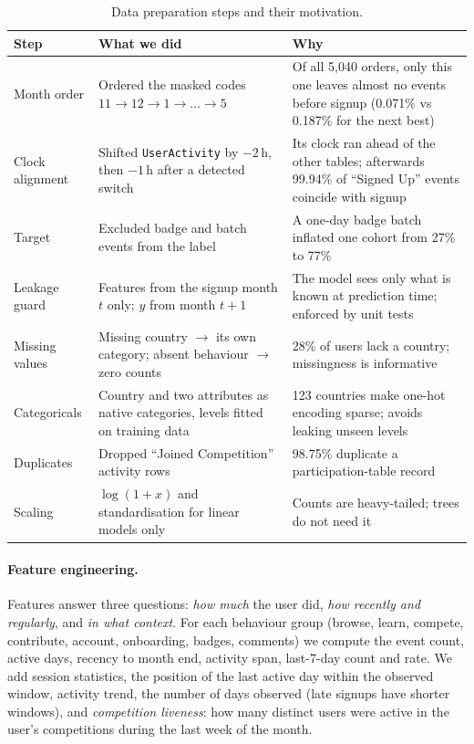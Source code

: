 \documentclass[11pt,a4paper]{article}
\begin{document}
\begin{table}[H]
\centering\small
\begin{tabularx}{\linewidth}{>{\raggedright\arraybackslash}p{2.7cm}XX}
\toprule
Step & What we did & Why\\
\midrule
Month order & Ordered the masked codes $11\to12\to1\to\dots\to5$ & Of all 5{,}040 orders, only this one leaves almost no events before signup (0.071\% vs 0.187\% for the next best)\\
Clock alignment & Shifted \texttt{UserActivity} by $-2$\,h, then $-1$\,h after a detected switch & Its clock ran ahead of the other tables; afterwards 99.94\% of ``Signed Up'' events coincide with signup\\
Target & Excluded badge and batch events from the label & A one-day badge batch inflated one cohort from 27\% to 77\%\\
Leakage guard & Features from the signup month $t$ only; $y$ from month $t{+}1$ & The model sees only what is known at prediction time; enforced by unit tests\\
Missing values & Missing country $\to$ its own category; absent behaviour $\to$ zero counts & 28\% of users lack a country; missingness is informative\\
Categoricals & Country and two attributes as native categories, levels fitted on training data & 123 countries make one-hot encoding sparse; avoids leaking unseen levels\\
Duplicates & Dropped ``Joined Competition'' activity rows & 98.75\% duplicate a participation-table record\\
Scaling & $\log(1+x)$ and standardisation for linear models only & Counts are heavy-tailed; trees do not need it\\
\bottomrule
\end{tabularx}
\caption{Data preparation steps and their motivation.}
\label{tab:prep}
\end{table}

\paragraph{Feature engineering.} Features answer three questions: \emph{how much} the user did,
\emph{how recently and regularly}, and \emph{in what context}. For each behaviour group (browse, learn,
compete, contribute, account, onboarding, badges, comments) we compute the event count, active days, recency
to month end, activity span, last-7-day count and rate. We add session statistics, the position of the last
active day within the observed window, activity trend, the number of days observed (late signups have
shorter windows), and \emph{competition liveness}: how many distinct users were active in the user's
competitions during the last week of the month.
\end{document}
